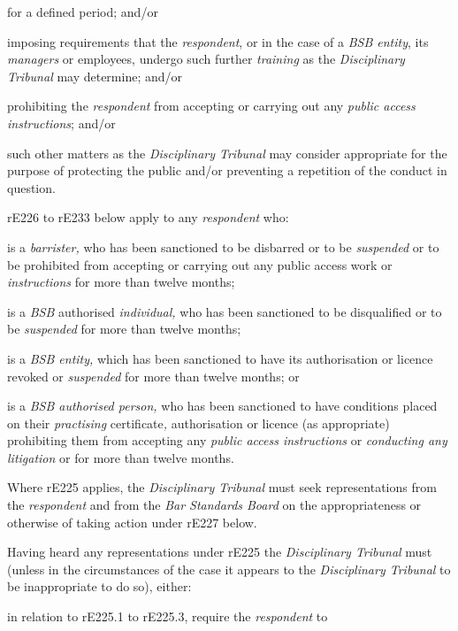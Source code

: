 for a defined period; and/or\item imposing requirements that the \emph{respondent}, or in the case of
a \emph{BSB entity}, its \emph{managers} or employees, undergo such
further \emph{training} as the \emph{Disciplinary Tribunal} may
determine; and/or\item prohibiting the \emph{respondent} from accepting or carrying out
any \emph{public access} \emph{instructions}; and/or\item such other matters as the \emph{Disciplinary Tribunal} may consider
appropriate for the purpose of protecting the public and/or preventing a
repetition of the conduct in question.\ln
{}\par
{}
rE226 to rE233\textbf{ }below apply to any \emph{respondent }who:\\\nl \item is a \emph{barrister, }who has been sanctioned to be disbarred or to
be \emph{suspended }or to be prohibited from accepting or carrying out
any public access work or \emph{instructions }for more than twelve
months;\item is a \emph{BSB }authorised\emph{ individual, }who has been sanctioned
to be disqualified\emph{ }or to be \emph{suspended }for more than twelve
months;\item is a \emph{BSB entity, }which has been sanctioned to have its
authorisation or licence revoked or \emph{suspended }for more than
twelve months; or\item is a \emph{BSB authorised person, }who has been sanctioned to have
conditions placed on
their \emph{practising }certificate\emph{, }authorisation or licence (as
appropriate) prohibiting them from accepting any \emph{public access
instructions }or \emph{conducting any litigation }or for more than
twelve months.\ln
{}\par
Where rE225\textbf{ }applies, the \emph{Disciplinary Tribunal }must seek
representations from the \emph{respondent }and from the \emph{Bar
Standards Board }on the appropriateness or otherwise of taking action
under rE227 below.\\
\par
Having heard any representations under
rE225\textbf{ }the \emph{Disciplinary Tribunal }must (unless in the
circumstances of the case it appears to the \emph{Disciplinary
Tribunal }to be inappropriate to do so), either:\\\nl \item in relation to rE225.1 to rE225.3, require the \emph{respondent} to
